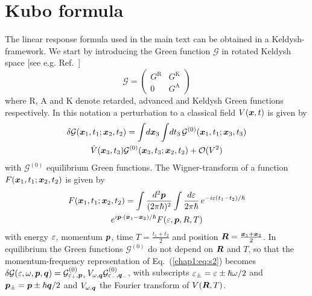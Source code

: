 \section{Kubo formula}
The linear response formula used in the main text can be obtained in a Keldysh-framework. We start by introducing the Green function $\mathcal{G}$ in rotated Keldysh space [see e.g. Ref.~\cite{rammer_quantum_1986}]
\begin{equation}
    \mathcal{G}=\begin{pmatrix}G^\text{R}&G^\text{K}\\0&G^\text{A}\end{pmatrix}
\end{equation}
where R, A and K denote retarded, advanced and Keldysh Green functions respectively. In this notation a perturbation to a classical field $V(\boldsymbol{x},t)$ is given by
\begin{multline}
    \delta\mathcal{G}(\boldsymbol{x}_1,t_1;\boldsymbol{x}_2,t_2)=\int\!d\boldsymbol{x}_3\int\!dt_3\, \mathcal{G}^{(0)}(\boldsymbol{x}_1,t_1;\boldsymbol{x}_3,t_3)\\\hat{V}(\boldsymbol{x}_3,t_3)\mathcal{G}^{(0)}(\boldsymbol{x}_3,t_3;\boldsymbol{x}_2,t_2)+\mathcal{O}(V^2)
    \label{chap1:eq:s2}
\end{multline}
with $\mathcal{G}^{(0)}$ equilibrium Green functions. The Wigner-transform of a function $F(\boldsymbol{x}_1,t_1;\boldsymbol{x}_2,t_2)$ is given by
  \begin{multline}
    F(\boldsymbol{x}_1,t_1;\boldsymbol{x}_2,t_2)=\int\frac{d^2\boldsymbol{p}}{(2\pi\hslash)^2}\int \frac{d\varepsilon}{2\pi\hslash}\,e^{-i\varepsilon(t_1-t_2)/\hslash}\\e^{i\boldsymbol{p}\cdot(\boldsymbol{x}_1-\boldsymbol{x}_2)/\hslash}F(\varepsilon,\boldsymbol{p},R,T)
   \end{multline}
with energy $\varepsilon$, momentum $\boldsymbol{p}$, time $T=\frac{t_1+t_2}{2}$ and position $\boldsymbol{R}=\frac{\boldsymbol{x}_1+\boldsymbol{x}_2}{2}$. In equilibrium the Green functions $\mathcal{G}^{(0)}$ do not depend on $\boldsymbol{R}$ and $T$, so that the momentum-frequency representation of Eq.~(\ref{chap1:eq:s2}) becomes 
   $\delta\mathcal{G}(\varepsilon,\omega,\boldsymbol{p},\boldsymbol{q})= \mathcal{G}^{(0)}_{\varepsilon_+,\boldsymbol{p}_+} V_{\omega,\boldsymbol{q}}\mathcal{G}^{{(0)}}_{\varepsilon_-,\boldsymbol{q}_-}$, 
with subscripts $\varepsilon_\pm=\varepsilon\pm\hslash\omega/2$ and $\boldsymbol{p}_\pm=\boldsymbol{p}\pm\hslash\boldsymbol{q}/2$ and $V_{\omega,\boldsymbol{q}}$ the Fourier transform of $V(\boldsymbol{R},T)$. 

